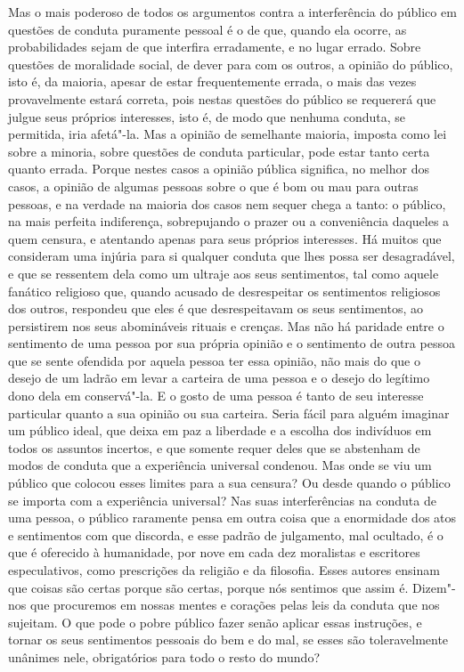 Mas o mais poderoso de todos os argumentos contra a interferência do
público em questões de conduta puramente pessoal é o de que, quando ela
ocorre, as probabilidades sejam de que interfira erradamente, e no
lugar errado. Sobre questões de moralidade social, de dever para com os
outros, a opinião do público, isto é, da maioria, apesar de estar
frequentemente errada, o mais das vezes provavelmente estará correta,
pois nestas questões do público se requererá que julgue seus próprios
interesses, isto é, de modo que nenhuma conduta, se permitida,
iria \mbox{afetá"-la}. Mas a opinião de semelhante maioria, imposta como lei
sobre a minoria, sobre questões de conduta particular, pode estar tanto
certa quanto errada. Porque nestes casos a opinião pública significa,
no melhor dos casos, a opinião de algumas pessoas sobre o que é bom ou
mau para outras pessoas, e na verdade na maioria dos casos nem sequer chega
a tanto: o público, na mais perfeita indiferença, sobrepujando o prazer
ou a conveniência daqueles a quem censura, e atentando apenas para seus
próprios interesses. Há muitos que consideram uma injúria para si
qualquer conduta que lhes possa ser desagradável, e que se ressentem
dela como um ultraje aos seus sentimentos, tal como aquele fanático
religioso que, quando acusado de desrespeitar os sentimentos religiosos
dos outros, respondeu que eles é que desrespeitavam os seus
sentimentos, ao persistirem nos seus abomináveis rituais e crenças. Mas
não há paridade entre o sentimento de uma pessoa por sua própria
opinião e o sentimento de outra pessoa que se sente ofendida por aquela
pessoa ter essa opinião, não mais do que o desejo de um ladrão em levar
a carteira de uma pessoa e o desejo do legítimo dono dela em
conservá"-la. E o gosto de uma pessoa é tanto de seu interesse
particular quanto a sua opinião ou sua carteira. Seria fácil para
alguém imaginar um público ideal, que deixa em paz a liberdade e a
escolha dos indivíduos em todos os assuntos incertos, e que somente
requer deles que se abstenham de modos de conduta que a
experiência universal condenou. Mas onde se viu um público que colocou
esses limites para a sua censura? Ou desde quando o público se importa
com a experiência universal? Nas suas interferências na conduta de uma
pessoa, o público raramente pensa em outra coisa que a enormidade dos
atos e sentimentos com que discorda, e esse padrão de julgamento, mal
ocultado, é o que é oferecido à humanidade, por nove  em cada dez
moralistas e escritores especulativos, como prescrições da
religião e da filosofia. Esses autores ensinam que coisas são certas
porque são certas, porque nós sentimos que assim é. Dizem"-nos que
procuremos em nossas mentes e corações pelas leis da conduta que nos
sujeitam. O que pode o pobre público fazer senão
aplicar essas instruções, e tornar os seus sentimentos pessoais do bem
e do mal, se esses são toleravelmente unânimes nele, obrigatórios para
todo o resto do mundo? 

